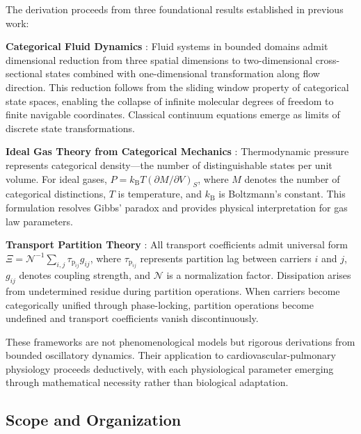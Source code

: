 \documentclass[12pt,a4paper]{article}
\theoremstyle{remark}
\newcommand{\kB}{k_{\mathrm{B}}}
\newcommand{\taulag}{\tau_{\mathrm{p}}}
\begin{document}
The derivation proceeds from three foundational results established in previous work:

\textbf{Categorical Fluid Dynamics} \cite{sachikonye2024fluid}: Fluid systems in bounded domains admit dimensional reduction from three spatial dimensions to two-dimensional cross-sectional states combined with one-dimensional transformation along flow direction. This reduction follows from the sliding window property of categorical state spaces, enabling the collapse of infinite molecular degrees of freedom to finite navigable coordinates. Classical continuum equations emerge as limits of discrete state transformations.

\textbf{Ideal Gas Theory from Categorical Mechanics} \cite{sachikonye2024gas}: Thermodynamic pressure represents categorical density—the number of distinguishable states per unit volume. For ideal gases, $P = \kB T (\partial M/\partial V)_{S}$, where $M$ denotes the number of categorical distinctions, $T$ is temperature, and $\kB$ is Boltzmann's constant. This formulation resolves Gibbs' paradox and provides physical interpretation for gas law parameters.

\textbf{Transport Partition Theory} \cite{sachikonye2024transport}: All transport coefficients admit universal form $\Xi = \mathcal{N}^{-1} \sum_{i,j} \taulag_{ij} g_{ij}$, where $\taulag_{ij}$ represents partition lag between carriers $i$ and $j$, $g_{ij}$ denotes coupling strength, and $\mathcal{N}$ is a normalization factor. Dissipation arises from undetermined residue during partition operations. When carriers become categorically unified through phase-locking, partition operations become undefined and transport coefficients vanish discontinuously.

These frameworks are not phenomenological models but rigorous derivations from bounded oscillatory dynamics. Their application to cardiovascular-pulmonary physiology proceeds deductively, with each physiological parameter emerging through mathematical necessity rather than biological adaptation.

\subsection{Scope and Organization}
\end{document}
